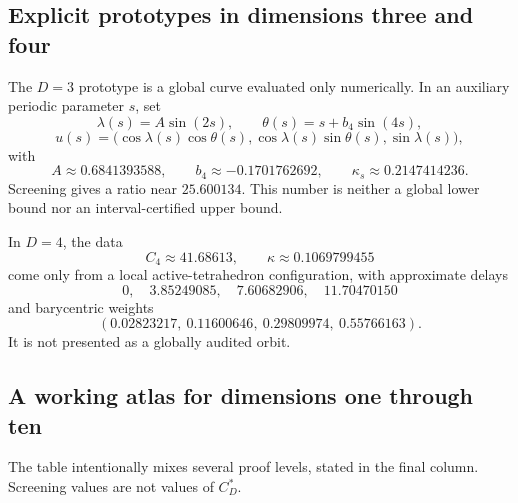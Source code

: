 \documentclass[10pt,a4paper]{article}
\newcommand{\cstar}{C^{*}}
\theoremstyle{plain}
\theoremstyle{definition}
\theoremstyle{remark}
\begin{document}
\subsection{Explicit prototypes in dimensions three and four}

The $D=3$ prototype is a global curve evaluated only numerically. In an auxiliary periodic parameter $s$, set
\[
  \lambda(s)=A\sin(2s),
  \qquad
  \theta(s)=s+b_4\sin(4s),
\]
\[
  u(s)=\bigl(\cos\lambda(s)\cos\theta(s),
  \cos\lambda(s)\sin\theta(s),
  \sin\lambda(s)\bigr),
\]
with
\[
  A\approx0.6841393588,
  \qquad
  b_4\approx-0.1701762692,
  \qquad
  \kappa_s\approx0.2147414236.
\]
Screening gives a ratio near $25.600134$. This number is neither a global lower bound nor an interval-certified upper bound.

In $D=4$, the data
\[
  C_4\approx41.68613,
  \qquad
  \kappa\approx0.1069799455
\]
come only from a local active-tetrahedron configuration, with approximate delays
\[
  0,\quad3.85249085,\quad7.60682906,\quad11.70470150
\]
and barycentric weights
\[
  (0.02823217,\ 0.11600646,\ 0.29809974,\ 0.55766163).
\]
It is not presented as a globally audited orbit.

\subsection{A working atlas for dimensions one through ten}

The table intentionally mixes several proof levels, stated in the final column. Screening values are not values of $\cstar_D$.
\end{document}
